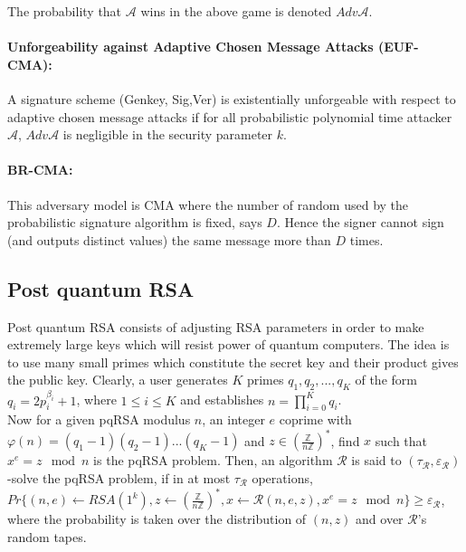 \documentclass[a4paper,11pt]{article}
\begin{document}
The probability that  $\mathcal{A}$ wins in the above game is denoted  $Adv\mathcal{A}$.

\paragraph{Unforgeability against Adaptive Chosen Message Attacks (EUF-CMA):}  A signature scheme (Genkey, Sig,Ver)
is existentially unforgeable with respect to adaptive chosen message attacks if for all probabilistic polynomial time attacker $\mathcal{A}$, $Adv\mathcal{A}$ is negligible in  the security parameter $k$.

\paragraph{BR-CMA:} This adversary model is CMA where the number of random used by the probabilistic signature algorithm is fixed, says $D$. Hence the signer cannot sign (and outputs distinct values) the same message more than $D$ times.

\subsection{Post quantum RSA }\label{sec:one:3}
Post quantum RSA consists of adjusting RSA parameters in order to make extremely large keys which will resist power of quantum computers. The idea is to use many small primes which constitute the secret key and their product gives the public key. Clearly, a user generates $K$ primes $q_1,q_2,...,q_K$ of the form $q_i=2p_i^{\beta_i}+1$, where $ 1\leq i\leq K$ and establishes $n=\prod_{i=0}^{K}{q_i}$.\\
Now for a given pqRSA modulus  $n$, an integer $e$ coprime with $\varphi (n)=(q_1-1)(q_2-1)...(q_K-1)$ and $z \in (\frac{\mathbb{Z}}{n\mathbb{Z}})^{*}$, find $x$ such that $x^{e} = z  \mod n$ is the pqRSA problem. Then, an algorithm $\mathcal{R}$ is said to $(\tau_{\mathcal{R}} , \varepsilon_{\mathcal{R}} )$-solve the pqRSA
problem, if in at most $\tau_{\mathcal{R}}$ operations, $Pr \lbrace (n,e) \leftarrow RSA(1^{k} ), z \leftarrow (\frac{\mathbb{Z}}{n\mathbb{Z}})^{*} , x \leftarrow \mathcal{R}(n, e, z), x^{e} = z \mod n\rbrace \geq \varepsilon_{\mathcal{R}} $, where the probability is taken over the distribution of $(n, z)$ and over $\mathcal{\mathcal{R}}$'s  random tapes.
\end{document}
